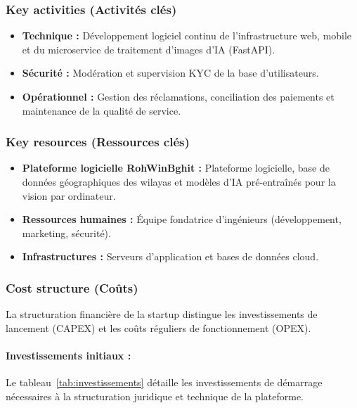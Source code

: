 \documentclass[11pt,a4paper]{article}
\begin{document}
\subsubsection{Key activities (Activités clés)}
\begin{itemize}[leftmargin=1.5em]
  \item \textbf{Technique :} Développement logiciel continu de l'infrastructure web, mobile et du microservice de traitement d'images d'IA (FastAPI).
  \item \textbf{Sécurité :} Modération et supervision KYC de la base d'utilisateurs.
  \item \textbf{Opérationnel :} Gestion des réclamations, conciliation des paiements et maintenance de la qualité de service.
\end{itemize}

\subsubsection{Key resources (Ressources clés)}
\begin{itemize}[leftmargin=1.5em]
  \item \textbf{Plateforme logicielle RohWinBghit :} Plateforme logicielle, base de données géographiques des wilayas et modèles d'IA pré-entraînés pour la vision par ordinateur.
  \item \textbf{Ressources humaines :} Équipe fondatrice d'ingénieurs (développement, marketing, sécurité).
  \item \textbf{Infrastructures :} Serveurs d'application et bases de données cloud.
\end{itemize}

\subsubsection{Cost structure (Coûts)}
La structuration financière de la startup distingue les investissements de lancement (CAPEX) et les coûts réguliers de fonctionnement (OPEX).

\paragraph{Investissements initiaux :} Le tableau~\ref{tab:investissements} détaille les investissements de démarrage nécessaires à la structuration juridique et technique de la plateforme.
\end{document}
